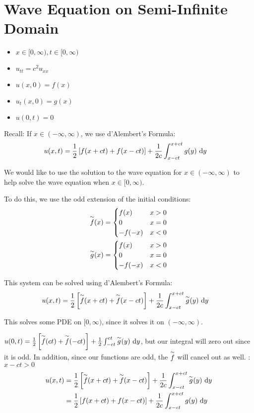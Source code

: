 \section{Wave Equation on Semi-Infinite Domain}
\begin{itemize}
  \item $x \in [0, \infty), t \in [0, \infty)$
  \item $u_{tt} = c^2 u_{xx}$
  \item $u(x, 0) = f(x)$
  \item $u_t(x, 0) = g(x)$
  \item $u(0, t) = 0$
\end{itemize}

Recall: If $x \in (-\infty, \infty)$, we use d'Alembert's Formula:
%
\begin{align}
  u(x, t) & = \frac{1}{2} \left[ f(x + ct) + f(x - ct) \right] +
  \frac{1}{2c} \int^{x + ct}_{x - ct} g(y)\ \text dy
\end{align}

We would like to use the solution to the wave equation for
$x \in (-\infty, \infty)$
to help solve the wave equation when
$x \in [0, \infty)$.

To do this, we use the odd extension of the initial conditions:
%
\begin{align}
  \overset{\sim}{f}(x) & =
  \begin{cases}
    f(x) & x > 0\\
    0 & x = 0\\
    -f(-x) & x < 0
  \end{cases}\\
  \overset{\sim}{g}(x) & =
  \begin{cases}
    f(x) & x > 0\\
    0 & x = 0\\
    -f(-x) & x < 0
  \end{cases}
\end{align}

This system can be solved using d'Alembert's Formula:
%
\begin{align}
  u(x, t) & = \frac{1}{2} \left[ \overset{\sim}{f}(x + ct) + \overset{\sim}{f}(x - ct) \right]
  + \frac{1}{2c} \int^{x + ct}_{x - ct} \overset{\sim}{g}(y)\ \text dy
\end{align}

\note This solves some PDE on $[0, \infty)$, since it solves it on
$(-\infty, \infty)$.

\note
$u(0, t) = \frac{1}{2} \left[ \overset{\sim}{f}(ct) + \overset{\sim}{f}(-ct)\right]
+ \frac{1}{2} \int^{ct}_{-ct} \overset{\sim}{g}(y)\ \text dy$, but our integral will
zero out since it is odd. In addition, since our functions are odd, the
$\overset{\sim}{f}$ will cancel out as well.
%
: $x - ct > 0$
%
\begin{align}
  u(x, t)
  & = \frac{1}{2} \left[ \overset{\sim}{f}(x + ct) + \overset{\sim}{f}(x - ct) \right] +
  \frac{1}{2c} \int^{x + ct}_{x - ct} \overset{\sim}{g}(y)\ \text dy\\
  & = \frac{1}{2} \left[ f(x + ct) + f(x - ct) \right] +
  \frac{1}{2c} \int^{x + ct}_{x - ct} g(y)\ \text dy
\end{align}

